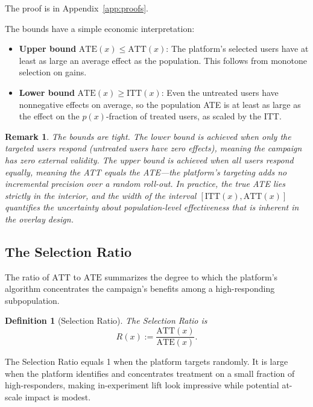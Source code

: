 \documentclass[12pt]{article}
\newtheorem{remark}{Remark}
\newtheorem{definition}{Definition}
\newcommand{\ATT}{\mathrm{ATT}}
\newcommand{\ATE}{\mathrm{ATE}}
\newcommand{\ITT}{\mathrm{ITT}}
\begin{document}
\noindent The proof is in Appendix~\ref{app:proofs}.

The bounds have a simple economic interpretation:
\begin{itemize}
  \item \textbf{Upper bound} $\ATE(x) \leq \ATT(x)$: The platform's
    selected users have at least as large an average effect as the
    population. This follows from monotone selection on gains.
  \item \textbf{Lower bound} $\ATE(x) \geq \ITT(x)$: Even the untreated
    users have nonnegative effects on average, so the population ATE
    is at least as large as the effect on the $p(x)$-fraction of treated
    users, as scaled by the ITT.
\end{itemize}

\begin{remark}
The bounds are tight. The lower bound is achieved when only the targeted
users respond (untreated users have zero effects), meaning the campaign
has zero external validity. The upper bound is achieved when all users
respond equally, meaning the ATT equals the ATE---the platform's targeting
adds no incremental precision over a random roll-out. In practice, the
true ATE lies strictly in the interior, and the width of the interval
$[\ITT(x), \ATT(x)]$ quantifies the uncertainty about population-level
effectiveness that is inherent in the overlay design.
\end{remark}

\subsection*{The Selection Ratio}

The ratio of $\ATT$ to $\ATE$ summarizes the degree to which the platform's
algorithm concentrates the campaign's benefits among a high-responding
subpopulation.

\begin{definition}[Selection Ratio]
\label{def:ratio}
The \emph{Selection Ratio} is
\begin{equation}
  R(x) := \frac{\ATT(x)}{\ATE(x)}.
  \label{eq:ratio}
\end{equation}
\end{definition}

The Selection Ratio equals 1 when the platform targets randomly. It is large
when the platform identifies and concentrates treatment on a small fraction
of high-responders, making in-experiment lift look impressive while potential
at-scale impact is modest.
\end{document}
